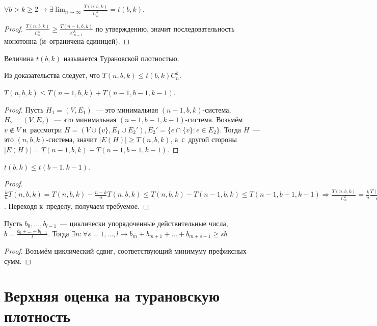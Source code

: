\documentclass{article}
\begin{document}
\begin{claim}
	$\forall b > k \ge 2 \rightarrow \exists \lim_{n \rightarrow \infty}
	\frac{T(n,b,k)}{C_n^k} = t(b, k)$.
\end{claim}
\begin{proof}
	$\frac{T(n,b,k)}{C_n^k} \ge \frac{T(n-1, b, k)}{C_{n-1}^k}$ по утверждению,
	значит последовательность монотонна (и~ограничена единицей).
\end{proof}

\begin{definition}
	Величина $t(b, k)$ называется Турановской плотностью.
\end{definition}

Из доказательства следует, что $T(n, b, k) \le t(b, k) C_n^k$.

\begin{claim}
	$T(n,b,k) \le T(n-1,b,k) + T(n-1,b-1,k-1)$.
\end{claim}
\begin{proof}
	Пусть $H_1 = (V, E_1)$~--- это минимальная $(n-1,b,k)$-система, $H_2 = (V,
	E_2)$~--- это минимальная $(n-1,b-1,k-1)$-система. Возьмём $v \notin V$
	и~рассмотри $H = (V \cup \{v\}, E_1 \cup E_2'), E_2' = \{e \cap \{v\}: e \in
	E_2\}$. Тогда $H$~--- это $(n,b,k)$-система, значит $|E(H)| \ge T(n, b, k)$,
	а~с~другой стороны $|E(H)| = T(n-1,b,k) + T(n-1,b-1,k-1)$.
\end{proof}

\begin{claim}
	$t(b,k) \le t(b-1,k-1)$.
\end{claim}
\begin{proof}
	$\frac{k}{n} T(n,b,k) = T(n,b,k) - \frac{n-k}{n}T(n,b,k) \le T(n,b,k) -
	T(n-1,b,k) \le T(n-1,b-1,k-1) \Rightarrow \frac{T(n,b,k)}{C_n^k} = \frac{k}{n}
	\frac{T(n,b,k)}{C_{n-1}^{k-1}} \le \frac{T(n-1,b-1,k-1)}{C_{n-1}^{k-1}}$.
	Переходя к~пределу, получаем требуемое.
\end{proof}

\begin{claim}[из анализа]
	Пусть $b_0, \ldots, b_{l-1}$~--- циклически упорядоченные действительные
	числа, $b = \frac{b_0 + \ldots + b_{l-1}}{l}$. Тогда $\exists n: \forall s =
	1, \ldots, l \rightarrow b_m + b_{m+1} + \ldots + b_{m+s-1} \ge sb$.
\end{claim}
\begin{proof}
	Возьмём циклический сдвиг, соответствующий минимуму префиксных сумм.
\end{proof}

\section{Верхняя оценка на турановскую плотность}
\end{document}
